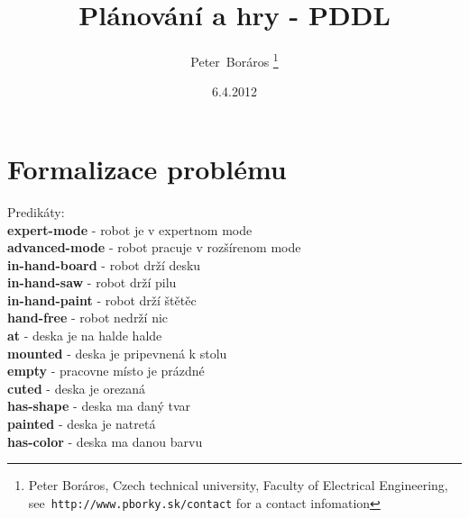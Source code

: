 \documentclass[a4paper,journal]{IEEEtran}
\begin{document}
\title{Pl\'anov\'an\'i a hry - PDDL}
\date{6.4.2012}
\author{Peter~Boráros %
\thanks{{Peter Boráros}, Czech technical university, Faculty of Electrical Engineering,
see~\texttt{http://www.pborky.sk/contact} for a contact infomation}}%


%

\maketitle
\IEEEdisplaynotcompsoctitleabstractindextext
\IEEEpeerreviewmaketitle


\section{Formalizace probl\'emu}

Predik\'aty:\\
\textbf{expert-mode} - robot je v expertnom mode\\
\textbf{advanced-mode} - robot pracuje v roz\v s\'irenom mode\\
\textbf{in-hand-board} - robot dr\v z\'i desku\\
\textbf{in-hand-saw} - robot dr\v z\'i pilu\\
\textbf{in-hand-paint} - robot dr\v z\'i \v st\v et\v ec\\
\textbf{hand-free}  - robot nedr\v z\'i nic\\
\textbf{at} - deska je na halde halde\\
\textbf{mounted} - deska je pripevnen\'a k stolu\\
\textbf{empty} - pracovne m\'isto je pr\'azdn\'e\\
\textbf{cuted} - deska je orezan\'a\\
\textbf{has-shape} - deska ma dan\'y tvar\\
\textbf{painted} - deska je natret\'a\\
\textbf{has-color} - deska ma danou barvu\\
\end{document}
